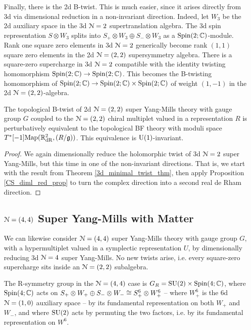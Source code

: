 \documentclass[10pt, oneside]{article}
\begin{document}
Finally, there is the 2d B-twist.  This is much easier, since it arises directly from 3d via dimensional reduction in a non-invariant direction.  Indeed, let $W_3$ be the 2d auxiliary space in the 3d $\mathcal{N}=2$ supertranslation algebra.  The 3d spin representation $S \otimes W_3$ splits into $S_+ \otimes W_3 \oplus S_- \otimes W_3$ as a $\mathrm{Spin}(2;\mathbb C)$-module.  Rank one square zero elements in 3d $\mathcal{N}=2$ generically become rank $(1,1)$ square zero elements in the 2d $\mathcal{N}=(2,2)$ supersymmetry algebra.  There is a square-zero supercharge in 3d $\mathcal{N}=2$ compatible with the identity twisting homomorphism $\mathrm{Spin}(2;\mathbb C) \to \mathrm{Spin}(2;\mathbb C)$.  This becomes the B-twisting homomorphism of $\mathrm{Spin}(2;\mathbb C) \to \mathrm{Spin}(2;\mathbb C) \times \mathrm{Spin}(2;\mathbb C)$ of weight $(1,-1)$ in the 2d $\mathcal{N}=(2,2)$-algebra.

\begin{theorem} \label{2d_2_B_twist_thm}
The topological B-twist of 2d $\mathcal{N}=(2,2)$ super Yang-Mills theory with gauge group $G$ coupled to the $\mathcal{N}=(2,2)$ chiral multiplet valued in a representation $R$ is perturbatively equivalent to the topological BF theory with moduli space $T^*[-1]\mathrm{Map}(\mathbb R^2_{\mathrm{dR}}, (R/\mathfrak{g}))$.  This equivalence is $\mathrm{U}(1)$-invariant.
\end{theorem}

\begin{proof}
We again dimensionally reduce the holomorphic twist of 3d $\mathcal{N}=2$ super Yang-Mills, but this time in one of the non-invariant directions.  That is, we start with the result from Theorem \ref{3d_minimal_twist_thm}, then apply Proposition \ref{CS_diml_red_prop} to turn the complex direction into a second real de Rham direction.
\end{proof}

\subsection{\texorpdfstring{$\mathcal N=(4,4)$}{N=(4,4)} Super Yang-Mills with Matter} \label{sect:2d(4,4)}
We can likewise consider $\mathcal{N}=(4,4)$ super Yang-Mills theory with gauge group $G$, with a hypermultiplet valued in a symplectic representation $U$, by dimensionally reducing 3d $\mathcal{N}=4$ super Yang-Mills.  No new twists arise, i.e. every square-zero supercharge sits inside an $\mathcal{N}=(2,2)$ subalgebra.

The R-symmetry group in the $\mathcal{N}=(4,4)$ case is $G_R = \mathrm{SU}(2) \times \mathrm{Spin}(4;\mathbb C)$, where $\mathrm{Spin}(4;\mathbb C)$ acts on $S_+ \otimes W_+ \oplus S_- \otimes W_- \cong S_+^6 \otimes W_+^6$ -- where $W_+^6$ is the 6d $\mathcal{N}=(1,0)$ auxiliary space -- by its fundamental representation on both $W_+$ and $W_-$, and where $\mathrm{SU}(2)$ acts by permuting the two factors, i.e. by its fundamental representation on $W^6$.
\end{document}
